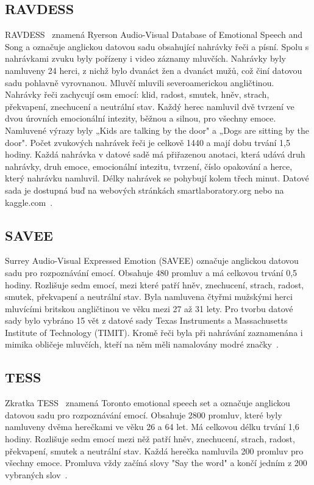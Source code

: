\documentclass[FM,BP]{tulthesis}
\newcommand{\extend}[1]{\todo[color=green!40]{#1}}
\begin{document}
\subsection{RAVDESS} \label{desc/ravdess} %
RAVDESS~\cite{Livingstone2018} znamená Ryerson Audio-Visual Database of Emotional Speech and Song a označuje anglickou datovou sadu obsahující nahrávky řeči a písní. Spolu s nahrávkami zvuku byly pořízeny i video záznamy mluvčích. Nahrávky byly namluveny 24 herci, z nichž bylo dvanáct žen a dvanáct mužů, což činí datovou sadu pohlavně vyrovnanou. Mluvčí mluvili severoamerickou angličtinou. Nahrávky řeči zachycují osm emocí: klid, radost, smutek, hněv, strach, překvapení, znechucení a neutrální stav. Každý herec namluvil dvě tvrzení ve dvou úrovních emocionální intezity, běžnou a silnou, pro všechny emoce. Namluvené výrazy byly „Kids are talking by the door" a „Dogs are sitting by the door". Počet zvukových nahrávek řeči je celkově 1440 a mají dobu trvání 1,5 hodiny. Každá nahrávka v datové sadě má přiřazenou anotaci, která udává druh nahrávky, druh emoce, emocionální intezitu, tvrzení, číslo opakování a herce, který nahrávku namluvil. Délky nahrávek se pohybují kolem třech minut. Datové sada je dostupná buď na webových stránkách smartlaboratory.org nebo na kaggle.com~\cite{smart_lab}.

\subsection{SAVEE} \label{desc/savee} %
Surrey Audio-Visual Expressed Emotion (SAVEE) označuje anglickou datovou sadu pro rozpoznávání emocí. Obsahuje 480 promluv a má celkovou trvání 0,5 hodiny. Rozlišuje sedm emocí, mezi které patří hněv, znechucení, strach, radost, smutek, překvapení a neutrální stav. Byla namluvena čtyřmi mužskými herci mluvícími britskou angličtinou ve věku mezi 27 až 31 lety. Pro tvorbu datové sady bylo vybráno 15 vět z datové sady Texas Instruments a Massachusetts Institute of Technology (TIMIT). \extend{reference} 
Kromě řeči byla při nahrávání zaznamenána i mimika obličeje mluvčích, kteří na něm měli namalovány modré značky~\cite{savee}.

\subsection{TESS} \label{desc/tess} %
Zkratka TESS~\cite{SP2/E8H2MF_2020} znamená Toronto emotional speech set a označuje anglickou datovou sadu pro rozpoznávání emocí. Obsahuje 2800 promluv, které byly namluveny dvěma herečkami ve věku 26 a 64 let. Má celkovou délku trvání 1,6 hodiny. Rozlišuje sedm emocí mezi něž patří hněv, znechucení, strach, radost, překvapení, smutek a neutrální stav. Každá herečka namluvila 200 promluv pro všechny emoce. Promluva vždy začíná slovy "Say the word" a končí jedním z 200 vybraných slov~\cite{tess}.
\end{document}
